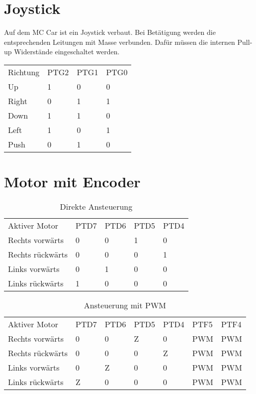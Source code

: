 \documentclass[a4paper,10pt,fleqn]{article}
\begin{document}
\section{Joystick}
Auf dem MC Car ist ein Joystick verbaut. Bei Betätigung werden die 
entsprechenden Leitungen mit Masse verbunden. Dafür müssen die internen 
Pull-up Widerstände eingeschaltet werden. 
\begin{table}[h!]
\begin{tabular}{llll}
\rowcolor{white} Richtung    & PTG2  & PTG1  & PTG0  \\
\rowcolor{lgray} Up          & 1     & 0     & 0     \\
\rowcolor{white} Right       & 0     & 1     & 1     \\
\rowcolor{lgray} Down        & 1     & 1     & 0     \\
\rowcolor{white} Left        & 1     & 0     & 1     \\
\rowcolor{lgray} Push        & 0     & 1     & 0     \\
\end{tabular}
\end{table}

\section{Motor mit Encoder}
\begin{table}[h!]
\begin{tabular}{lllll}
\rowcolor{white} Aktiver Motor      & PTD7  & PTD6  & PTD5  & PTD4  \\
\rowcolor{lgray} Rechts vorwärts    & 0     & 0     & 1     & 0     \\
\rowcolor{white} Rechts rückwärts   & 0     & 0     & 0     & 1     \\
\rowcolor{lgray} Links vorwärts     & 0     & 1     & 0     & 0     \\
\rowcolor{white} Links rückwärts    & 1     & 0     & 0     & 0     \\
\end{tabular}
\caption{Direkte Ansteuerung}
\end{table}
\begin{table}[h!]
\begin{tabular}{lllllll}
\rowcolor{white} Aktiver Motor      & PTD7  & PTD6  & PTD5  & PTD4  & PTF5  & PTF4  \\
\rowcolor{lgray} Rechts vorwärts    & 0     & 0     & Z     & 0     & PWM   & PWM   \\
\rowcolor{white} Rechts rückwärts   & 0     & 0     & 0     & Z     & PWM   & PWM   \\
\rowcolor{lgray} Links vorwärts     & 0     & Z     & 0     & 0     & PWM   & PWM   \\
\rowcolor{white} Links rückwärts    & Z     & 0     & 0     & 0     & PWM   & PWM   \\
\end{tabular}
\caption{Ansteuerung mit PWM}
\end{table}
\end{document}
